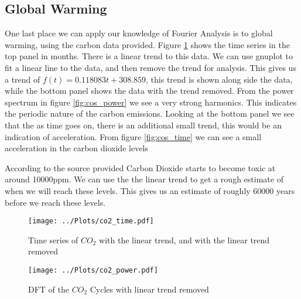\subsection{Global Warming}
One last place we can apply our knowledge of Fourier Analysis is to global warming, using the carbon data provided. Figure \ref{fig:co2_time} shows the time series in the top panel in months. There is a linear trend to this data. We can use gnuplot to fit a linear line to the data, and then remove the trend for analysis. This gives us a trend of $f(t) = 0.118083t + 308.859$, this trend is shown along side the data, while the bottom panel shows the data with the trend removed. From the power spectrum in figure \ref{fig:cos_power} we see a very strong harmonics. This indicates the periodic nature of the carbon emissions. Looking at the bottom panel we see that the as time goes on, there is an additional small trend, this would be an indication of acceleration. From figure \ref{fig:cos_time} we can see a small acceleration in the carbon dioxide levels

According to the source provided Carbon Dioxide starts to become toxic at around 10000ppm. We can use the the linear trend to get a rough estimate of when we will reach these levels. This gives us an estimate of roughly 60000 years before we reach these levels. 


\begin{figure}[ht]
    \centering
    \texttt{[image: ../Plots/co2\_time.pdf]}
    \caption{Time series of $CO_{2}$ with the linear trend, and with the linear trend removed}
    \label{fig:co2_time}
\end{figure}

\begin{figure}[ht]
    \centering
    \texttt{[image: ../Plots/co2\_power.pdf]}
    \caption{DFT of the $CO_{2}$ Cycles with linear trend removed}
    \label{fig:co2_power}
\end{figure}





